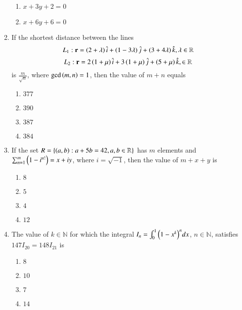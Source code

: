 \documentclass[journal,12pt,onecolumn]{IEEEtran}
\theoremstyle{remark}
\begin{document}
\begin{enumerate}[start=1]
\begin{enumerate}
			\item $x+3y+2=0$\\
			\item $x+6y+6=0$\\
		\end{enumerate}
	\item If the shortest distance between the lines
		$$L_1:\mathbf{r}=\left(2+\lambda\right)\hat{i}+\left(1-3\lambda\right)\hat{j}+\left(3+4\lambda\right)\hat{k},    \lambda\in\mathbb{R}$$
		$$L_2:\mathbf{r}=2\left(1+\mu\right)\hat{i}+3\left(1+\mu\right)\hat{j}+\left(5+\mu\right)\hat{k},\in\mathbb{R}$$
		is $\frac{m}{\sqrt{n}}$, where $\gcd\left(m,n\right)=1$, then the value of $m+n$ equals 
		\begin{enumerate}
			\item $377$\\
			\item $390$\\
			\item $387$\\
			\item $384$\\
		\end{enumerate}
	\item If the set $R=\left\{\left(a,b\right):a+5b=42,a,b\in\mathbb{R}\right\}$ has $m$ elements and $\sum_{n=1}^{m}\left(1-i^{n!}\right)=x+iy$, where $i=\sqrt{-1}$, then the value of $m+x+y$ is
		\begin{enumerate}
			\item $8$\\
			\item $5$\\
			\item $4$\\
			\item $12$\\
		\end{enumerate}
	\item The value of $k\in\mathbb{N}$ for which the integral $I_n=\int_{0}^{1}{\left(1-x^k\right)}^ndx$, $n\in\mathbb{N}$, satisfies $147I_{20}=148I_{21}$ is
		\begin{enumerate}
			\item $8$\\
			\item $10$\\
			\item $7$\\
			\item $14$\\
		\end{enumerate}


\end{enumerate}
\end{document}
